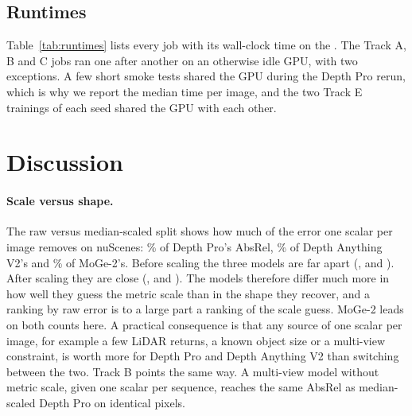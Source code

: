 \documentclass[10pt]{article}
\newcommand{\gpu}{\GPUname}
\begin{document}
\subsection{Runtimes}
\label{sec:runtimes}

Table~\ref{tab:runtimes} lists every job with its wall-clock time on the \gpu{}. The Track A, B and C jobs
ran one after another on an otherwise idle GPU, with two exceptions. A few short smoke tests shared the GPU
during the Depth Pro rerun, which is why we report the median time per image, and the two Track E trainings
of each seed shared the GPU with each other.

\begin{table}[t]
\centering
\caption{Wall-clock time of every job on the \gpu{} (LiDAR projection on the CPU).}
\label{tab:runtimes}
\end{table}

\section{Discussion}
\label{sec:discussion}

\paragraph{Scale versus shape.}
The raw versus median-scaled split shows how much of the error one scalar per image removes on nuScenes:
\DPscaleShare\% of Depth Pro's AbsRel, \DAVscaleShare\% of Depth Anything V2's and \MOGEscaleShare\% of
MoGe-2's. Before scaling the three models are far apart (\MOGEabsrelRaw, \DPabsrelRaw{} and
\DAVabsrelRaw). After scaling they are close (\MOGEabsrelScaled, \DPabsrelScaled{} and \DAVabsrelScaled).
The models therefore differ much more in how well they guess the metric scale than in the shape they
recover, and a ranking by raw error is to a large part a ranking of the scale guess. MoGe-2 leads on both
counts here. A practical consequence is that any source of one scalar per image, for example a few LiDAR
returns, a known object size or a multi-view constraint, is worth more for Depth Pro and Depth Anything V2
than switching between the two. Track B points the same way. A multi-view model without metric scale, given
one scalar per sequence, reaches the same AbsRel as median-scaled Depth Pro on identical pixels.
\end{document}
